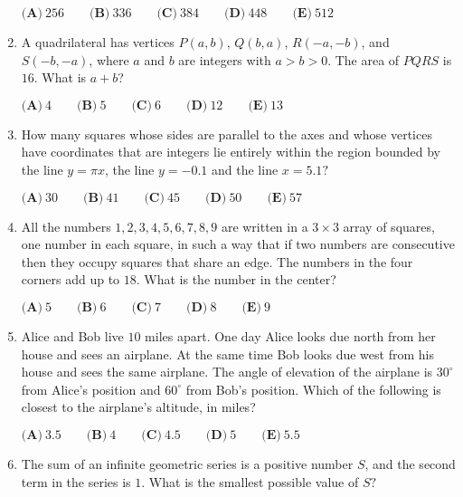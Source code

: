 \documentclass{article}
\begin{document}
\begin{enumerate}[label=\arabic*., itemsep=0.5em]
\(\textbf{(A)}\ 256\qquad\textbf{(B)}\ 336\qquad\textbf{(C)}\ 384\qquad\textbf{(D)}\ 448\qquad\textbf{(E)}\ 512\)\par \vspace{0.5em}\item A quadrilateral has vertices \(P(a,b)\), \(Q(b,a)\), \(R(-a, -b)\), and \(S(-b, -a)\), where \(a\) and \(b\) are integers with \(a>b>0\). The area of \(PQRS\) is \(16\). What is \(a+b\)?

\(\textbf{(A)}\ 4 \qquad\textbf{(B)}\ 5 \qquad\textbf{(C)}\ 6 \qquad\textbf{(D)}\ 12  \qquad\textbf{(E)}\ 13\)\par \vspace{0.5em}\item How many squares whose sides are parallel to the axes and whose vertices have coordinates that are integers lie entirely within the region bounded by the line \(y=\pi x\), the line \(y=-0.1\) and the line \(x=5.1?\)

\(\textbf{(A)}\ 30 \qquad
\textbf{(B)}\ 41 \qquad
\textbf{(C)}\ 45 \qquad
\textbf{(D)}\ 50 \qquad
\textbf{(E)}\ 57\)\par \vspace{0.5em}\item All the numbers \(1, 2, 3, 4, 5, 6, 7, 8, 9\) are written in a \(3\times3\) array of squares, one number in each square, in such a way that if two numbers are consecutive then they occupy squares that share an edge. The numbers in the four corners add up to \(18\). What is the number in the center?

\(\textbf{(A)}\ 5\qquad\textbf{(B)}\ 6\qquad\textbf{(C)}\ 7\qquad\textbf{(D)}\ 8\qquad\textbf{(E)}\ 9\)\par \vspace{0.5em}\item Alice and Bob live \(10\) miles apart. One day Alice looks due north from her house and sees an airplane. At the same time Bob looks due west from his house and sees the same airplane. The angle of elevation of the airplane is \(30^\circ\) from Alice's position and \(60^\circ\) from Bob's position. Which of the following is closest to the airplane's altitude, in miles?

\(\textbf{(A)}\ 3.5 \qquad\textbf{(B)}\ 4 \qquad\textbf{(C)}\ 4.5 \qquad\textbf{(D)}\ 5 \qquad\textbf{(E)}\ 5.5\)\par \vspace{0.5em}\item The sum of an infinite geometric series is a positive number \(S\), and the second term in the series is \(1\). What is the smallest possible value of \(S?\)


\end{enumerate}
\end{document}
